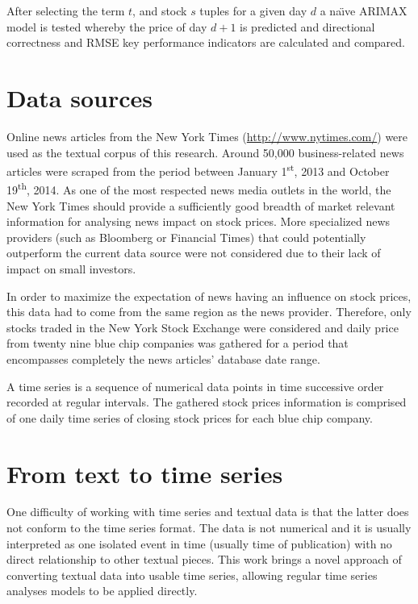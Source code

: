 \documentclass[conference,11pt]{IEEEtran}
\begin{document}
\par
After selecting the term \(t\), and stock \(s\) tuples for a given day \(d\) a na\"{\i}ve ARIMAX model is tested whereby the price of day \(d+1\) is predicted and directional correctness and RMSE key performance indicators are calculated and compared.

\section{Data sources}
Online news articles from the New York Times (\url{http://www.nytimes.com/}) were used as the textual corpus of this research. Around 50,000 business-related news articles were scraped from the period between January 1\textsuperscript{st}, 2013 and October 19\textsuperscript{th}, 2014. As one of the most respected news media outlets in the world, the New York Times should provide a sufficiently good breadth of market relevant information for analysing news impact on stock prices. More specialized news providers (such as Bloomberg or Financial Times) that could potentially outperform the current data source were not considered due to their lack of impact on small investors.

\par
In order to maximize the expectation of news having an influence on stock prices, this data had to come from the same region as the news provider. Therefore, only stocks traded in the New York Stock Exchange were considered and daily price from twenty nine blue chip companies was gathered for a period that encompasses completely the news articles' database date range.

\par
A time series is a sequence of numerical data points in time successive order recorded at regular intervals. The gathered stock prices information is comprised of one daily time series of closing stock prices for each blue chip company.

\section{From text to time series}
One difficulty of working with time series and textual data is that the latter does not conform to the time series format. The data is not numerical and it is usually interpreted as one isolated event in time (usually time of publication) with no direct relationship to other textual pieces. This work brings a novel approach of converting textual data into usable time series, allowing regular time series analyses models to be applied directly.
\end{document}
